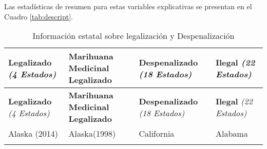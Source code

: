 \documentclass[11pt,]{article}
\begin{document}
Las estadísticas de resumen para estas variables explicativas se
presentan en el Cuadro \ref{tab:descript}.

\begin{longtable}[]{@{}llll@{}}
\caption{Información estatal sobre legalización y
Despenalización}\tabularnewline
\toprule
\begin{minipage}[b]{0.20\columnwidth}\raggedright
\textbf{Legalizado} \emph{(4 Estados)}\strut
\end{minipage} & \begin{minipage}[b]{0.26\columnwidth}\raggedright
\textbf{Marihuana Medicinal Legalizado}\strut
\end{minipage} & \begin{minipage}[b]{0.24\columnwidth}\raggedright
\textbf{Despenalizado} \emph{(18 Estados)}\strut
\end{minipage} & \begin{minipage}[b]{0.19\columnwidth}\raggedright
\textbf{Ilegal} \emph{(22 Estados)}\strut
\end{minipage}\tabularnewline
\midrule
\endfirsthead
\toprule
\begin{minipage}[b]{0.20\columnwidth}\raggedright
\textbf{Legalizado} \emph{(4 Estados)}\strut
\end{minipage} & \begin{minipage}[b]{0.26\columnwidth}\raggedright
\textbf{Marihuana Medicinal Legalizado}\strut
\end{minipage} & \begin{minipage}[b]{0.24\columnwidth}\raggedright
\textbf{Despenalizado} \emph{(18 Estados)}\strut
\end{minipage} & \begin{minipage}[b]{0.19\columnwidth}\raggedright
\textbf{Ilegal} \emph{(22 Estados)}\strut
\end{minipage}\tabularnewline
\midrule
\endhead
\begin{minipage}[t]{0.20\columnwidth}\raggedright
Alaska (2014)\strut
\end{minipage} & \begin{minipage}[t]{0.26\columnwidth}\raggedright
Alaska(1998)\strut
\end{minipage} & \begin{minipage}[t]{0.24\columnwidth}\raggedright
California\strut
\end{minipage} & \begin{minipage}[t]{0.19\columnwidth}\raggedright
Alabama\strut
\end{minipage}\tabularnewline
\begin{minipage}[t]{0.20\columnwidth}\raggedright

\end{minipage}
\end{longtable}
\end{document}
